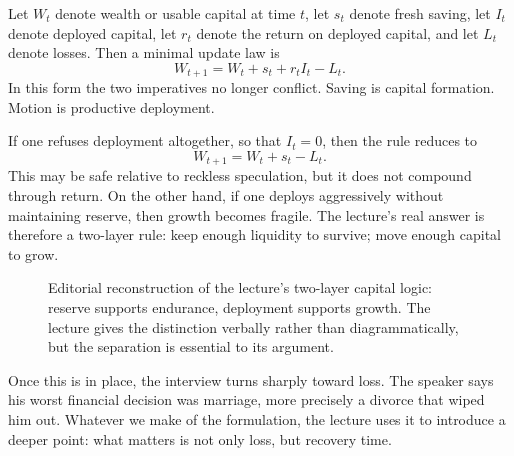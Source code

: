 Let \(W_t\) denote wealth or usable capital at time \(t\), let \(s_t\) denote fresh saving, let \(I_t\) denote deployed capital, let \(r_t\) denote the return on deployed capital, and let \(L_t\) denote losses. Then a minimal update law is
\begin{equation}
W_{t+1} = W_t + s_t + r_t I_t - L_t.
\end{equation}
In this form the two imperatives no longer conflict. Saving is capital formation. Motion is productive deployment.

If one refuses deployment altogether, so that \(I_t=0\), then the rule reduces to
\begin{equation}
W_{t+1} = W_t + s_t - L_t.
\end{equation}
This may be safe relative to reckless speculation, but it does not compound through return. On the other hand, if one deploys aggressively without maintaining reserve, then growth becomes fragile. The lecture's real answer is therefore a two-layer rule: keep enough liquidity to survive; move enough capital to grow.

\begin{figure}
\centering
{}
\caption{Editorial reconstruction of the lecture's two-layer capital logic: reserve supports endurance, deployment supports growth. The lecture gives the distinction verbally rather than diagrammatically, but the separation is essential to its argument.}
\end{figure}

Once this is in place, the interview turns sharply toward loss. The speaker says his worst financial decision was marriage, more precisely a divorce that wiped him out. Whatever we make of the formulation, the lecture uses it to introduce a deeper point: what matters is not only loss, but recovery time.


